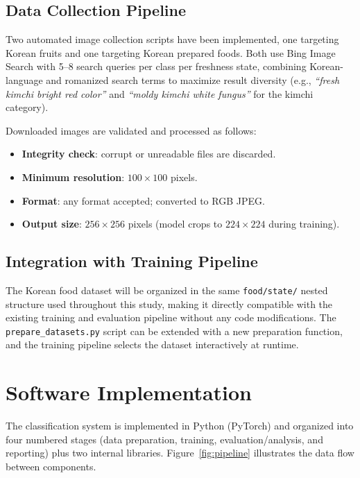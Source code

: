 \documentclass[12pt, a4paper]{article}
\begin{document}
\subsection{Data Collection Pipeline}

Two automated image collection scripts have been implemented, one targeting
Korean fruits and one targeting Korean prepared foods.
Both use Bing Image Search with 5--8 search queries per class per freshness
state, combining Korean-language and romanized search terms to maximize
result diversity (e.g., \textit{``fresh kimchi bright red color''} and
\textit{``moldy kimchi white fungus''} for the kimchi category).

Downloaded images are validated and processed as follows:
\begin{itemize}
    \item \textbf{Integrity check}: corrupt or unreadable files are discarded.
    \item \textbf{Minimum resolution}: $100 \times 100$ pixels.
    \item \textbf{Format}: any format accepted; converted to RGB JPEG.
    \item \textbf{Output size}: $256 \times 256$ pixels
    (model crops to $224 \times 224$ during training).
\end{itemize}

\subsection{Integration with Training Pipeline}

The Korean food dataset will be organized in the same
\texttt{food/state/} nested structure used throughout this study,
making it directly compatible with the existing training and evaluation
pipeline without any code modifications.
The \texttt{prepare\_datasets.py} script can be extended with a new
preparation function, and the training pipeline selects the dataset
interactively at runtime.

\section{Software Implementation}
\label{sec:sw}

The classification system is implemented in Python (PyTorch) and organized into
four numbered stages (data preparation, training, evaluation/analysis, and
reporting) plus two internal libraries.
Figure~\ref{fig:pipeline} illustrates the data flow between components.
\end{document}
